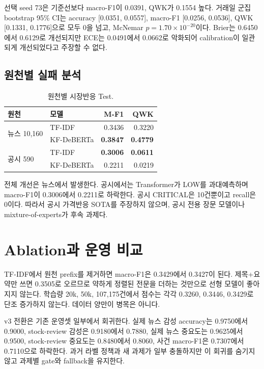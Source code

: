 \documentclass[10pt,a4paper,twocolumn]{article}
\begin{document}
선택 seed 73은 기준선보다 macro-F1이 0.0391, QWK가 0.1554 높다. 거래일 군집 bootstrap 95\% CI는 accuracy [0.0351, 0.0557], macro-F1 [0.0256, 0.0536], QWK [0.1331, 0.1776]으로 모두 0을 넘고, McNemar $p=1.70\times10^{-20}$이다. Brier는 0.6450에서 0.6129로 개선되지만 ECE는 0.0491에서 0.0662로 악화되어 calibration이 일관되게 개선되었다고 주장할 수 없다.

\subsection{원천별 실패 분석}

\begin{table}[t]
\centering
\small
\begin{tabular}{llrr}
\toprule
원천 & 모델 & M-F1 & QWK \\
\midrule
\multirow{2}{*}{뉴스 10,160} & TF-IDF & 0.3436 & 0.3220 \\
 & KF-DeBERTa & \textbf{0.3847} & \textbf{0.4779} \\
\multirow{2}{*}{공시 590} & TF-IDF & \textbf{0.3006} & \textbf{0.0611} \\
 & KF-DeBERTa & 0.2211 & 0.0219 \\
\bottomrule
\end{tabular}
\caption{원천별 시장반응 Test.}
\label{tab:source-ko}
\end{table}

전체 개선은 뉴스에서 발생한다. 공시에서는 Transformer가 LOW를 과대예측하며 macro-F1이 0.3006에서 0.2211로 하락한다. 공시 CRITICAL은 10건뿐이고 recall은 0이다. 따라서 공시 가격반응 SOTA를 주장하지 않으며, 공시 전용 장문 모델이나 mixture-of-experts가 후속 과제다.

\section{Ablation과 운영 비교}

TF-IDF에서 원천 prefix를 제거하면 macro-F1은 0.3429에서 0.3427이 된다. 제목+요약만 쓰면 0.3505로 오르므로 약하게 정렬된 전문을 더하는 것만으로 선형 모델이 좋아지지 않는다. 학습량 20k, 50k, 107,175건에서 점수는 각각 0.3260, 0.3446, 0.3429로 단조 증가하지 않는다. 데이터 양만이 병목은 아니다.

v3 전환은 기존 운영셋 일부에서 회귀한다. 실제 뉴스 감성 accuracy는 0.9750에서 0.9000, stock-review 감성은 0.9180에서 0.7880, 실제 뉴스 중요도는 0.9625에서 0.9500, stock-review 중요도는 0.8480에서 0.8060, 사건 macro-F1은 0.7307에서 0.7110으로 하락한다. 과거 라벨 정책과 새 과제가 일부 충돌하지만 이 회귀를 숨기지 않고 과제별 gate와 fallback을 유지한다.
\end{document}
